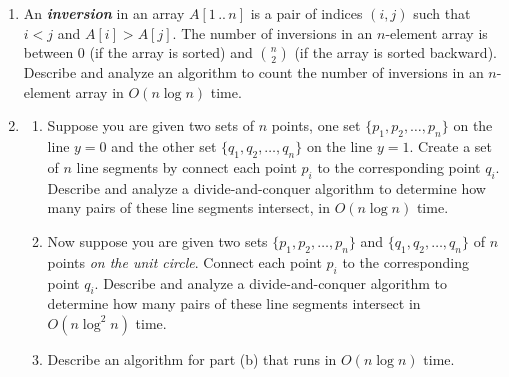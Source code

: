 \begin{exercises}
\begin{enumerate}[label=\arabic*.,ref=\thechapter.\arabic*,leftmargin=*,align=left,itemsep=1.5ex plus 0.5ex,resume]
The comparisons performed by this algorithm do not depend at all on the values in the input array; such a sorting algorithm is called \textbf{\textit{oblivious}}. Assume for this problem that the input size $n$ is always a power of $2$.
\begin{enumerate}
\item Prove by induction that  correctly sorts any input array. 
\item Prove that  would \emph{not} correctly sort if we removed the for-loop from .
\item Prove that  would \emph{not} correctly sort if we swapped the last two lines of .
\item What is the running time of ? Justify your answer.
\item What is the running time of ? Justify your answer.
\end{enumerate}
\item An \textbf{\textit{inversion}} in an array $A[1\,..\,n]$ is a pair of indices $(i, j)$ such that $i < j$ and $A[i] > A[j]$. The number of inversions in an $n$-element array is between $0$ (if the array is sorted) and $\binom{n}{2}$ (if the array is sorted backward). Describe and analyze an algorithm to count the number of inversions in an $n$-element array in $O(n \log n)$ time. 
\item
\begin{enumerate}
\item Suppose you are given two sets of $n$ points, one set $\{p_1, p_2, \ldots, p_n\}$ on the line $y = 0$ and the other set $\{q_1, q_2, \ldots, q_n\}$ on the line $y = 1$. Create a set of $n$ line segments by connect each point $p_i$ to the corresponding point $q_i$. Describe and analyze a divide-and-conquer algorithm to determine how many pairs of these line segments intersect, in $O(n \log n)$ time. 
\item Now suppose you are given two sets $\{p_1, p_2, \ldots, p_n\}$ and $\{q_1, q_2, \ldots, q_n\}$ of $n$ points \emph{on the unit circle}. Connect each point $p_i$ to the corresponding point $q_i$. Describe and analyze a divide-and-conquer algorithm to determine how many pairs of these line segments intersect in $O(n \log^2 n)$ time. 
\item {} Describe an algorithm for part (b) that runs in $O(n \log n)$ time. 

\end{enumerate}
\end{enumerate}
\end{exercises}
